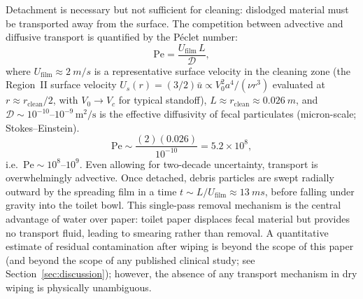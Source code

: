 \documentclass[aps,prfluids,reprint,amsmath,amssymb,floatfix]{revtex4-2}
\newcommand{\Pe}{\mathrm{Pe}}
\begin{document}
Detachment is necessary but not sufficient for cleaning: dislodged material
must be transported away from the surface. The competition between advective
and diffusive transport is quantified by the P\'{e}clet number:
\begin{equation}
    \Pe = \frac{U_\mathrm{film}\,L}{\mathcal{D}},
    \label{eq:peclet}
\end{equation}
where $U_\mathrm{film} \approx \SI{2}{m/s}$ is a representative surface
velocity in the cleaning zone (the Region~II surface velocity
$U_s(r) = (3/2)\bar u \propto V_0^2 a^4/(\nu r^3)$ evaluated at
$r \approx r_\mathrm{clean}/2$, with $V_0 \to V_c$ for typical standoff),
$L \approx r_\mathrm{clean} \approx \SI{0.026}{m}$,
and $\mathcal{D} \sim 10^{-10}$--$10^{-9}\,\mathrm{m^2/s}$ is the effective
diffusivity of fecal particulates (micron-scale; Stokes--Einstein).
\begin{equation}
    \Pe \sim \frac{(2)(0.026)}{10^{-10}} = 5.2 \times 10^8,
    \label{eq:peval}
\end{equation}
i.e.\ $\Pe \sim 10^{8}$--$10^9$. Even allowing for two-decade
uncertainty, transport is overwhelmingly advective. Once detached, debris particles are
swept radially outward by the spreading film in a time $t \sim L/U_\mathrm{film}
\approx \SI{13}{ms}$, before falling under gravity into the toilet bowl.
This single-pass removal mechanism is the central advantage of water over
paper: toilet paper displaces fecal material but provides no transport fluid,
leading to smearing rather than removal. A quantitative estimate of residual
contamination after wiping is beyond the scope of this paper (and beyond
the scope of any published clinical study; see Section~\ref{sec:discussion});
however, the absence of any transport mechanism in dry wiping is physically
unambiguous.
\end{document}
